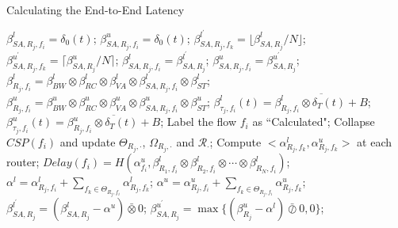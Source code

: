 \documentclass[10pt,journal]{IEEEtran}
\begin{document}
\begin{algorithm}
\caption{Calculating the End-to-End Latency}
\label{alg:equivalentservicecurve}
\begin{algorithmic}[1]
            \STATE $\beta_{SA,R_j,f_i}^l=\delta_0(t)$;
            \STATE $\beta_{SA,R_j,f_i}^u=\delta_0(t)$;
        \ENDFOR
    \ENDFOR
                    \STATE $\beta_{SA,R_j,f_k}^{l^\prime}=\lfloor\beta_{SA,R_j}^l/N\rfloor$;
                    \STATE $\beta_{SA,R_j,f_k}^{u^\prime}=\lceil\beta_{SA,R_j}^u/N\rceil$;
                \ENDFOR
            \ENDIF
                \STATE $\beta_{SA,R_j,f_i}^l=\beta_{SA,R_j}^{l^\prime}$;
                \STATE $\beta_{SA,R_j,f_i}^u=\beta_{SA,R_j}^{u^\prime}$;
            \ENDIF
            \STATE $\beta_{R_j,f_i}^l=\beta_{BW}^l\otimes\beta_{RC}^l\otimes\beta_{VA}^l\otimes\beta_{SA,R_j,f_i}^l\otimes \beta_{ST}^l$;
            \STATE $\beta_{R_j,f_i}^u=\beta_{BW}^u\otimes\beta_{RC}^u\otimes\beta_{VA}^u\otimes\beta_{SA,R_j,f_i}^u\otimes \beta_{ST}^u$;
        \ENDFOR
            \STATE $\beta^{l}_{\tau_j,f_i}(t)=\overline{\beta^l_{R_j,f_i}\otimes\delta_T(t)+B}$;
            \STATE $\beta^{u}_{\tau_j,f_i}(t)=\overline{\beta^u_{R_j,f_i}\otimes\delta_T(t)+B}$;
        \ENDFOR
        \STATE Label the flow $f_i$ as ``Calculated";
        \STATE Collapse $CSP(f_i)$ and update $\Theta_{R_j,\cdot}$, $\Omega_{R_j,\cdot}$ and $\mathcal{R}_{\cdot}$;
        \STATE Compute $<\alpha^l_{R_j,f_k},\alpha^u_{R_j,f_k}>$ at each router;
        \STATE $Delay(f_i)=H(\alpha^u_{f_i},\beta^l_{R_1,f_i}\otimes\beta^l_{R_2,f_i}\otimes\cdots\otimes\beta^l_{R_N,f_i})$;
                    \STATE $\alpha^l=\alpha^l_{R_j,f_i}+\sum_{f_k\in\Theta_{R_j,f_i}}\alpha^l_{R_j,f_k}$;
                    \STATE $\alpha^u=\alpha^u_{R_j,f_i}+\sum_{f_k\in\Theta_{R_j,f_i}}\alpha^u_{R_j,f_k}$;
                    \STATE $\beta^{l^\prime}_{SA,R_j}=(\beta^l_{SA,R_j}-\alpha^u)\bar{\otimes}0$;
                    \STATE $\beta^{u^\prime}_{SA,R_j}=\max\{(\beta^u_{R_j}-\alpha^l)\bar{\oslash}0,0\}$;
                \ENDIF
            \ENDIF
        \ENDFOR
    \ENDFOR
\end{algorithmic}
\end{algorithm}
\end{document}
